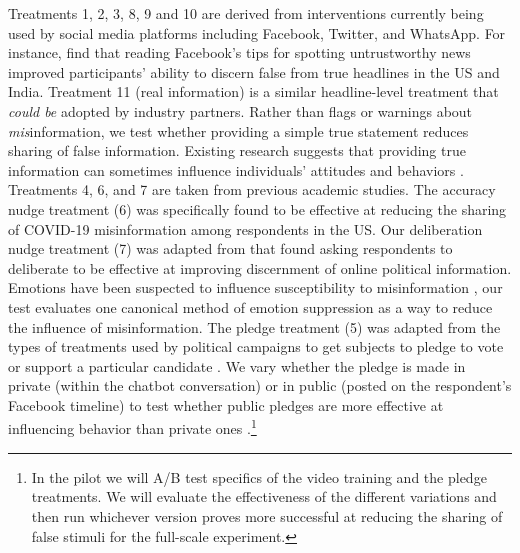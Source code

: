 \documentclass[letterpaper, 12pt, parskip=full,DIV=10]{scrartcl}
\begin{document}
Treatments 1, 2, 3, 8, 9 and 10 are derived from interventions currently being used by social media platforms including Facebook, Twitter, and WhatsApp. For instance, \citet{guessetal2020digital} find that reading Facebook's tips for spotting untrustworthy news improved participants' ability to discern false from true headlines in the US and India. Treatment 11 (real information) is a similar headline-level treatment that \textit{could be} adopted by industry partners. Rather than flags or warnings about \textit{mis}information, we test whether providing a simple true statement reduces sharing of false information. Existing research suggests that providing true information can sometimes influence individuals' attitudes and behaviors \citep{gilens2001political}. %
Treatments 4, 6, and 7 are taken from previous academic studies. The accuracy nudge treatment (6) was specifically found to be effective at reducing the sharing of COVID-19 misinformation among respondents in the US. Our deliberation nudge treatment (7) was adapted from \citet{bago2020fake} that found asking respondents to deliberate to be effective at improving discernment of online political information. Emotions have been suspected to influence susceptibility to misinformation \citep{martel2019reliance}, our test evaluates one canonical method of emotion suppression as a way to reduce the influence of misinformation. The pledge treatment (5) was adapted from the types of treatments used by political campaigns to get subjects to pledge to vote or support a particular candidate \citep{costa2018walking}. %
We vary whether the pledge is made in private (within the chatbot conversation) or in public (posted on the respondent's Facebook timeline) to test whether public pledges are more effective at influencing behavior than private ones \citep{cotterill2013impact}.\footnote{In the pilot we will A/B test specifics of the video training and the pledge treatments. We will evaluate the effectiveness of the different variations and then run whichever version proves more successful at reducing the sharing of false stimuli for the full-scale experiment.}
\end{document}
